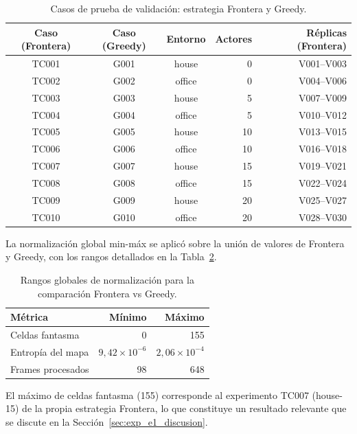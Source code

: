 \begin{table}[htbp]
    \centering
    \caption{Casos de prueba de validación: estrategia Frontera y Greedy.}%
    \label{tab:casos_frontera}
    \begin{tabular}{cccrr}
        \toprule
        \textbf{Caso (Frontera)} & \textbf{Caso (Greedy)} & \textbf{Entorno} & \textbf{Actores} & \textbf{Réplicas (Frontera)} \\
        \midrule
        TC001 & G001 & house  &  0 & V001–V003 \\
        TC002 & G002 & office &  0 & V004–V006 \\
        TC003 & G003 & house  &  5 & V007–V009 \\
        TC004 & G004 & office &  5 & V010–V012 \\
        TC005 & G005 & house  & 10 & V013–V015 \\
        TC006 & G006 & office & 10 & V016–V018 \\
        TC007 & G007 & house  & 15 & V019–V021 \\
        TC008 & G008 & office & 15 & V022–V024 \\
        TC009 & G009 & house  & 20 & V025–V027 \\
        TC010 & G010 & office & 20 & V028–V030 \\
        \bottomrule
    \end{tabular}
\end{table}

La normalización global min-máx se aplicó sobre la unión de valores de Frontera y Greedy, con los rangos detallados en la Tabla~\ref{tab:rangos_globales_e1}.

\begin{table}[htbp]
    \centering
    \caption{Rangos globales de normalización para la comparación Frontera vs Greedy.}%
    \label{tab:rangos_globales_e1}
    \begin{tabular}{lrr}
        \toprule
        \textbf{Métrica} & \textbf{Mínimo} & \textbf{Máximo} \\
        \midrule
        Celdas fantasma & 0 & 155 \\
        Entropía del mapa & $9{,}42 \times 10^{-6}$ & $2{,}06 \times 10^{-4}$ \\
        Frames procesados & 98 & 648 \\
        \bottomrule
    \end{tabular}
\end{table}

\noindent El máximo de celdas fantasma (155) corresponde al experimento TC007 (house-15) de la propia estrategia Frontera, lo que constituye un resultado relevante que se discute en la Sección~\ref{sec:exp_e1_discusion}.

